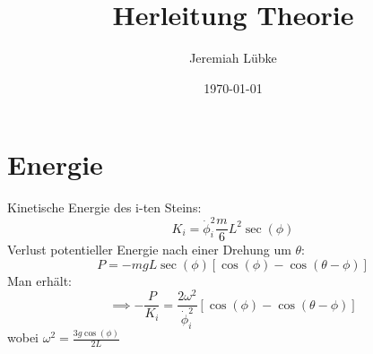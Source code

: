 \documentclass[11pt,a4paper]{scrartcl}
\title{Herleitung Theorie}
\date{\today}
\author{Jeremiah Lübke}
\def\phii{\dot{\phi}_i}
\def\pki{\frac{P}{K_i}}
\begin{document}
\maketitle

\section{Energie}
Kinetische Energie des i-ten Steins:
\[
    K_i = \phii^2 \frac{m}{6}L^2\sec(\phi)
\]
Verlust potentieller Energie nach einer Drehung um \(\theta\):
\[
    P = -m g L \sec(\phi) \left[ \cos(\phi) - \cos(\theta - \phi) \right]
\]
Man erhält:
\begin{equation}\label{eq:pk}
    \implies -\pki = \frac{2\omega^2}{\phii^2} \left[ \cos(\phi) -
    \cos(\theta-\phi) \right]
\end{equation}
wobei \(\omega^2 = \frac{3g\cos(\phi)}{2L}\)
\end{document}
